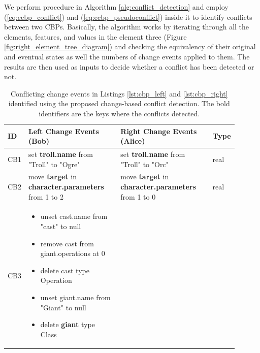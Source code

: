 We perform procedure in Algorithm \ref{alg:conflict_detection} and employ (\ref{eq:ecbp_conflict}) and (\ref{eq:ecbp_pseudoconflict}) inside it to identify conflicts between two CBPs. Basically, the algorithm works by iterating through all the elements, features, and values in the element three (Figure \ref{fig:right_element_tree_diagram}) and checking the equivalency of their original and eventual states as well the numbers of change events applied to them. The results are then used as inputs to decide whether a conflict has been detected or not.

\begin{table}[ht]
  \centering
  \caption{Conflicting change events in Listings \ref{lst:cbp_left} and \ref{lst:cbp_right} identified using the proposed change-based conflict detection. The bold identifiers are the keys where the conflicts detected.}
  \label{table:conflicts_cbp}
    \begin{tabular}{|p{0.04\linewidth}|p{0.4\linewidth}|p{0.4\linewidth}|
        p{0.06\linewidth}|}
      \hline
      \textbf{ID} & 
      \textbf{Left Change Events (Bob)} & 
      \textbf{Right Change Events (Alice)} & 
      \textbf{Type}\\ 
      \hline
      CB1 & 
      set \textbf{troll.name} from "Troll" to "Ogre" & 
      set \textbf{troll.name} from "Troll" to "Orc" & 
      real \\
      \hline
      CB2 & move \textbf{target} in \textbf{character.parameters} from 1 to 2 & 
      move \textbf{target} in \textbf{character.parameters} from 1 to 0 & 
      real \\ 
      \hline
      CB3 & 
      \begin{minipage}[t]{\linewidth}
        \raggedright
        \begin{itemize}[leftmargin=0pt]
          \setlength
          \item[] unset cast.name from "cast" to null
          \item[] remove cast from giant.operations at 0
          \item[] delete cast type Operation
          \item[] unset giant.name from "Giant" to null
          \item[] delete \textbf{giant} type Class
        \end{itemize}
      \end{minipage}
      & 
      \begin{minipage}[t]{\linewidth}
        \raggedright
        \begin{itemize}[leftmargin=0pt]

\end{itemize}
\end{minipage}
\end{tabular}
\end{table}
